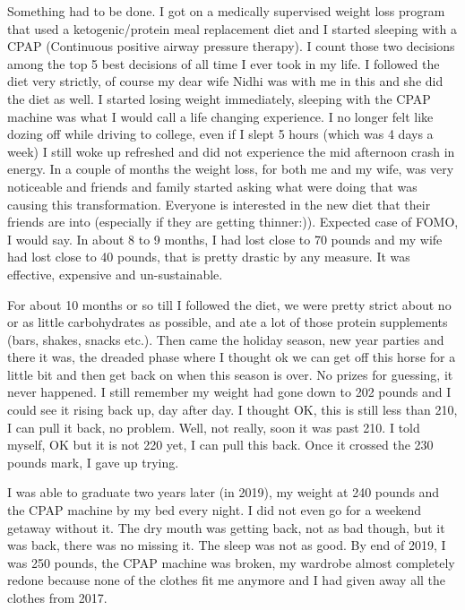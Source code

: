 \documentclass[
  oneside]{book}
\begin{document}
Something had to be done. I got on a medically supervised weight loss program that used a ketogenic/protein meal replacement diet and I started sleeping with a CPAP (Continuous positive airway pressure therapy). I count those two decisions among the top 5 best decisions of all time I ever took in my life. I followed the diet very strictly, of course my dear wife Nidhi was with me in this and she did the diet as well. I started losing weight immediately, sleeping with the CPAP machine was what I would call a life changing experience. I no longer felt like dozing off while driving to college, even if I slept 5 hours (which was 4 days a week) I still woke up refreshed and did not experience the mid afternoon crash in energy. In a couple of months the weight loss, for both me and my wife, was very noticeable and friends and family started asking what were doing that was causing this transformation. Everyone is interested in the new diet that their friends are into (especially if they are getting thinner:)). Expected case of FOMO, I would say. In about 8 to 9 months, I had lost close to 70 pounds and my wife had lost close to 40 pounds, that is pretty drastic by any measure. It was effective, expensive and un-sustainable.

For about 10 months or so till I followed the diet, we were pretty strict about no or as little carbohydrates as possible, and ate a lot of those protein supplements (bars, shakes, snacks etc.). Then came the holiday season, new year parties and there it was, the dreaded phase where I thought ok we can get off this horse for a little bit and then get back on when this season is over. No prizes for guessing, it never happened. I still remember my weight had gone down to 202 pounds and I could see it rising back up, day after day. I thought OK, this is still less than 210, I can pull it back, no problem. Well, not really, soon it was past 210. I told myself, OK but it is not 220 yet, I can pull this back. Once it crossed the 230 pounds mark, I gave up trying.

I was able to graduate two years later (in 2019), my weight at 240 pounds and the CPAP machine by my bed every night. I did not even go for a weekend getaway without it. The dry mouth was getting back, not as bad though, but it was back, there was no missing it. The sleep was not as good. By end of 2019, I was 250 pounds, the CPAP machine was broken, my wardrobe almost completely redone because none of the clothes fit me anymore and I had given away all the clothes from 2017.
\end{document}
